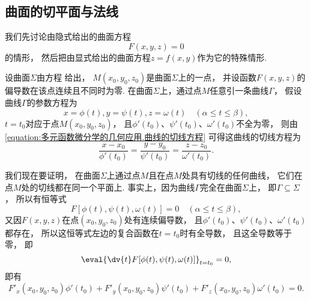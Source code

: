 \subsection{曲面的切平面与法线}
我们先讨论由隐式给出的曲面方程 
\[
	F(x,y,z) = 0
\]的情形，
然后把由显式给出的曲面方程\(z = f(x,y)\)作为它的特殊情形.

设曲面\(\Sigma\)由方程  给出，
\(M(x_0,y_0,z_0)\)是曲面\(\Sigma\)上的一点，
并设函数\(F(x,y,z)\)的偏导数在该点连续且不同时为零.
在曲面\(\Sigma\)上，通过点\(M\)任意引一条曲线\(\Gamma\)，
假设曲线\(\Gamma\)的参数方程为
\begin{equation}\label{equation:多元函数微分学的几何应用.曲面上的曲线.中间步骤1}
	x = \phi(t),
	y = \psi(t),
	z = \omega(t)
	\quad (\alpha \leq t \leq \beta),
\end{equation}
\(t = t_0\)对应于点\(M(x_0,y_0,z_0)\)，
且\(\phi'(t_0)\)、\(\psi'(t_0)\)、\(\omega'(t_0)\)不全为零，
则由\cref{equation:多元函数微分学的几何应用.曲线的切线方程}
可得这曲线的切线方程为\[
	\frac{x-x_0}{\phi'(t_0)}
	=\frac{y-y_0}{\psi'(t_0)}
	=\frac{z-z_0}{\omega'(t_0)}.
\]

我们现在要证明，
在曲面\(\Sigma\)上通过点\(M\)且在点\(M\)处具有切线的任何曲线，
它们在点\(M\)处的切线都在同一个平面上.
事实上，因为曲线\(\Gamma\)完全在曲面\(\Sigma\)上，
即\(\Gamma \subseteq \Sigma\)，
所以有恒等式\[
	F[\phi(t),\psi(t),\omega(t)] = 0
	\quad(\alpha \leq t \leq \beta),
\]
又因\(F(x,y,z)\)在点\((x_0,y_0,z_0)\)处有连续偏导数，
且\(\phi'(t_0)\)、\(\psi'(t_0)\)、\(\omega'(t_0)\)都存在，
所以这恒等式左边的复合函数在\(t = t_0\)时有全导数，
且这全导数等于零，
即\[
	\eval{\dv{t} F[\phi(t),\psi(t),\omega(t)]}_{t=t_0} = 0,
\]
即有\begin{equation}\label{equation:多元函数微分学的几何应用.曲面上的曲线.中间步骤2}
	F'_x(x_0,y_0,z_0) \phi'(t_0)
	+ F'_y(x_0,y_0,z_0) \psi'(t_0)
	+ F'_z(x_0,y_0,z_0) \omega'(t_0)
	= 0.
\end{equation}

